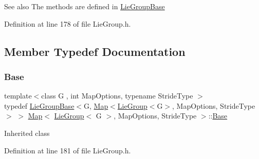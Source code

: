 \begin{DoxySeeAlso}{See also}
The methods are defined in \hyperlink{class_lie_group_base}{Lie\+Group\+Base} 
\end{DoxySeeAlso}


Definition at line 178 of file Lie\+Group.\+h.



\subsection{Member Typedef Documentation}
\hypertarget{class_map_3_01_lie_group_3_01_g_01_4_00_01_map_options_00_01_stride_type_01_4_a09cb088c0990b2ab5558a5ecd245f2c4}{}\label{class_map_3_01_lie_group_3_01_g_01_4_00_01_map_options_00_01_stride_type_01_4_a09cb088c0990b2ab5558a5ecd245f2c4} 
\subsubsection{\texorpdfstring{Base}{Base}}
{\footnotesize\ttfamily template$<$class G , int Map\+Options, typename Stride\+Type $>$ \\
typedef \hyperlink{class_lie_group_base}{Lie\+Group\+Base}$<$G, \hyperlink{class_map_3_01_lie_group_3_01_g_01_4_00_01_map_options_00_01_stride_type_01_4_a141753f9a4186911b53b5b25cfd716ed}{Map}$<$\hyperlink{class_lie_group}{Lie\+Group}$<$G$>$, Map\+Options, Stride\+Type $>$ $>$ \hyperlink{class_map_3_01_lie_group_3_01_g_01_4_00_01_map_options_00_01_stride_type_01_4_a141753f9a4186911b53b5b25cfd716ed}{Map}$<$ \hyperlink{class_lie_group}{Lie\+Group}$<$ G $>$, Map\+Options, Stride\+Type $>$\+::\hyperlink{class_map_3_01_lie_group_3_01_g_01_4_00_01_map_options_00_01_stride_type_01_4_a09cb088c0990b2ab5558a5ecd245f2c4}{Base}\hspace{0.3cm}{\ttfamily [protected]}}

Inherited class 

Definition at line 181 of file Lie\+Group.\+h.

\hypertarget{class_map_3_01_lie_group_3_01_g_01_4_00_01_map_options_00_01_stride_type_01_4_a3140b440390b3c15c7361ab182a91f91}{}\label{class_map_3_01_lie_group_3_01_g_01_4_00_01_map_options_00_01_stride_type_01_4_a3140b440390b3c15c7361ab182a91f91} 
